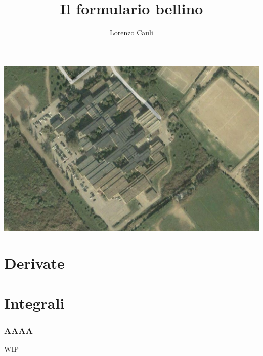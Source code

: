 \documentclass[10pt, a4paper]{article}
\title{Il formulario bellino}
\author{Lorenzo Cauli}
\begin{document}
    \maketitle
    \hspace{-35pt}\includegraphics[width=400pt]{images/scano.png}
    \newpage
    \tableofcontents

    \newpage
    \part{Derivate}
    
    
    
    
    
    

    \newpage
    \part{Integrali}
    \section{AAAA}
    \huge{WIP}
\end{document}
